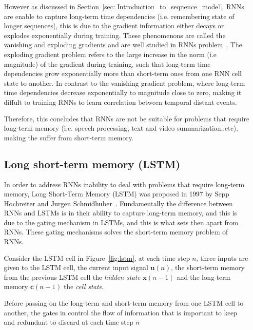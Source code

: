 \documentclass{WitsPhysicsReport}
\begin{document}
However as discussed in Section~\ref{sec: Introduction_to_sequence_model}, RNNs are enable to capture long-term time dependencies (i.e. remembering state of longer sequences), this is due to the gradient information either decays or  explodes exponentially during training. These phenomenons are called the vanishing and exploding gradients and are well studied in RNNs problem~\cite{pascanu2013difficulty}. The exploding gradient problem refers to the large increase in the norm (i.e magnitude) of the gradient during training, such that long-term time dependencies grow exponentially more than short-term ones from one RNN cell state to another. In contrast to the vanishing gradient problem, where long-term time dependencies decrease exponentially to magnitude close to zero, making it diffult to training RNNs to learn correlation between temporal distant events.


Therefore, this concludes that RNNs are not be suitable for problems that require long-term memory (i.e. speech processing, text and video summarization..etc), making the suffer from short-term memory.


\subsection{Long short-term memory (LSTM)}
\label{sec:Long_Short_Term_Memory}
In order to address RNNs inability to deal with problems that require long-term memory, Long Short-Term Memory (LSTM) was proposed in 1997 by Sepp Hochreiter and Jurgen Schmidhuber~\cite{schmidhuber1992fixed}. Fundamentally the difference between RNNs and LSTMs is in their ability to capture long-term memory, and this is due to the gating mechanism in LSTMs, and this is what sets then apart from RNNs. These gating mechanisms solves the short-term memory problem of RNNs. 


Consider the LSTM cell in Figure~\ref{fig:lstm}, at each time step $n$, three inputs are given to the LSTM cell, the current input signal $\mathbf{u}(n)$, the short-term memory from the previous LSTM cell the \textit{hidden state}  $\mathbf{x}(n-1)$ and the long-term memory $\mathbf{c}(n-1)$ the \textit{cell state}.

Before passing on the long-term and short-term memory from one LSTM cell to another, the gates in control the flow of information that is important to keep and redundant to discard at each time step $n$ 
\end{document}

